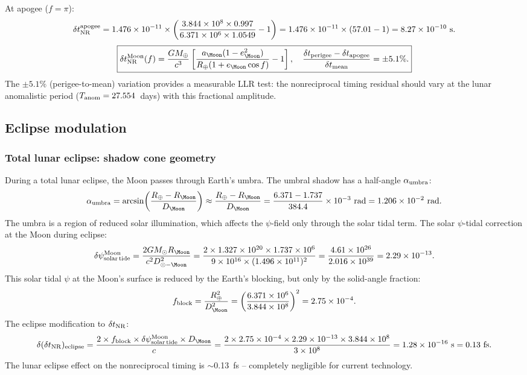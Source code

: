 \documentclass[aps,prd,twocolumn,superscriptaddress,nofootinbib,longbibliography]{revtex4-2}
\begin{document}
At apogee ($f = \pi$):
\begin{equation}
\delta t_{\rm NR}^{\rm apogee}
= 1.476\times10^{-11}\times\left(\frac{3.844\times10^8\times0.997}{6.371\times10^6\times1.0549} - 1\right)
= 1.476\times10^{-11}\times(57.01 - 1) = 8.27\times10^{-10}\ \si{s}.
\end{equation}
\begin{equation}
\boxed{
\delta t_{\rm NR}^{\rm Moon}(f)
= \frac{GM_\oplus}{c^3}\left[\frac{a_\Moon(1-e_\Moon^2)}{R_\oplus(1+e_\Moon\cos f)} - 1\right],
\quad\frac{\delta t_{\rm perigee} - \delta t_{\rm apogee}}{\delta t_{\rm mean}} = \pm5.1\%.
}
\end{equation}
The $\pm5.1\%$ (perigee-to-mean) variation provides a measurable LLR test:
the nonreciprocal timing residual should vary at the lunar anomalistic period
($T_{\rm anom} = 27.554$~days) with this fractional amplitude.

\subsection{Eclipse modulation}

\subsubsection{Total lunar eclipse: shadow cone geometry}

During a total lunar eclipse, the Moon passes through Earth's umbra.
The umbral shadow has a half-angle $\alpha_{\rm umbra}$:
\begin{equation}
\alpha_{\rm umbra} = \arcsin\!\left(\frac{R_\oplus - R_\Moon}{D_\Moon}\right)
\approx \frac{R_\oplus - R_\Moon}{D_\Moon}
= \frac{6.371 - 1.737}{384.4}\times10^{-3}\ \si{rad}
= 1.206\times10^{-2}\ \si{rad}.
\end{equation}
The umbra is a region of reduced solar illumination, which affects the
$\psi$-field only through the solar tidal term.  The solar $\psi$-tidal
correction at the Moon during eclipse:
\begin{equation}
\delta\psi_{\rm solar\,tide}^{\rm Moon}
= \frac{2GM_\odot R_\Moon}{c^2 D_{\odot-\Moon}^2}
= \frac{2\times1.327\times10^{20}\times1.737\times10^6}{9\times10^{16}\times(1.496\times10^{11})^2}
= \frac{4.61\times10^{26}}{2.016\times10^{39}} = 2.29\times10^{-13}.
\end{equation}
This solar tidal $\psi$ at the Moon's surface is reduced by the Earth's
blocking, but only by the solid-angle fraction:
\begin{equation}
f_{\rm block} = \frac{R_\oplus^2}{D_\Moon^2} = \left(\frac{6.371\times10^6}{3.844\times10^8}\right)^2
= 2.75\times10^{-4}.
\end{equation}
The eclipse modification to $\delta t_{\rm NR}$:
\begin{equation}
\delta(\delta t_{\rm NR})_{\rm eclipse}
= \frac{2\times f_{\rm block}\times\delta\psi_{\rm solar\,tide}^{\rm Moon}\times D_\Moon}{c}
= \frac{2\times2.75\times10^{-4}\times2.29\times10^{-13}\times3.844\times10^8}{3\times10^8}
= 1.28\times10^{-16}\ \si{s} = 0.13\ \si{fs}.
\end{equation}
The lunar eclipse effect on the nonreciprocal timing is $\sim$0.13~fs --
completely negligible for current technology.
\end{document}
